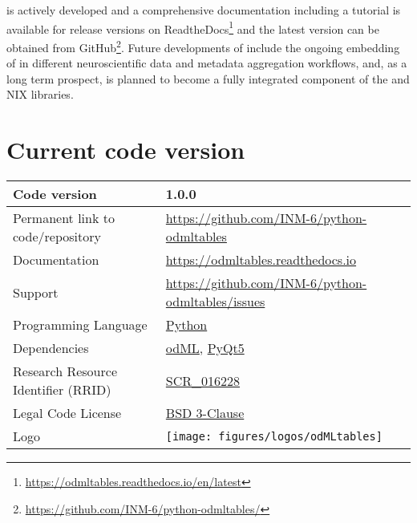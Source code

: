  is actively developed and a comprehensive documentation including a tutorial is available for release versions on ReadtheDocs\footnote{\url{https://odmltables.readthedocs.io/en/latest}} and the latest version can be obtained from GitHub\footnote{\url{https://github.com/INM-6/python-odmltables/}}. Future developments of  include the ongoing embedding of  in different neuroscientific data and metadata aggregation workflows, and, as a long term prospect,  is planned to become a fully integrated component of the  and NIX libraries.


\section{Current code version}
\label{sec:code_version}

\begin{tabular}{ll}
\hline
Code version & 1.0.0 \\
\hline
Permanent link to code/repository & \href{https://github.com/INM-6/python-odmltables}{https://github.com/INM-6/python-odmltables}\\
\hline
Documentation & \href{https://odmltables.readthedocs.io}{https://odmltables.readthedocs.io}\\
\hline
Support & \href{https://github.com/INM-6/python-odmltables/issues}{https://github.com/INM-6/python-odmltables/issues}\\
\hline
Programming Language & \href{https://www.python.org/}{Python}\\
\hline
Dependencies & \href{http://g-node.github.io/python-odml/}{odML}, \href{https://wiki.python.org/moin/PyQt}{PyQt5}\\  
\hline
Research Resource Identifier (RRID) & \href{https://scicrunch.org/scicrunch/Resources/record/nlx_144509-1/SCR_016228/resolver}{SCR\_016228}\\
\hline
Legal Code License  & \href{https://github.com/INM-6/python-odmltables/blob/master/LICENSE.txt}{BSD 3-Clause} \\
\hline
Logo &
\texttt{[image: figures/logos/odMLtables]}\\
\hline
\end{tabular}


